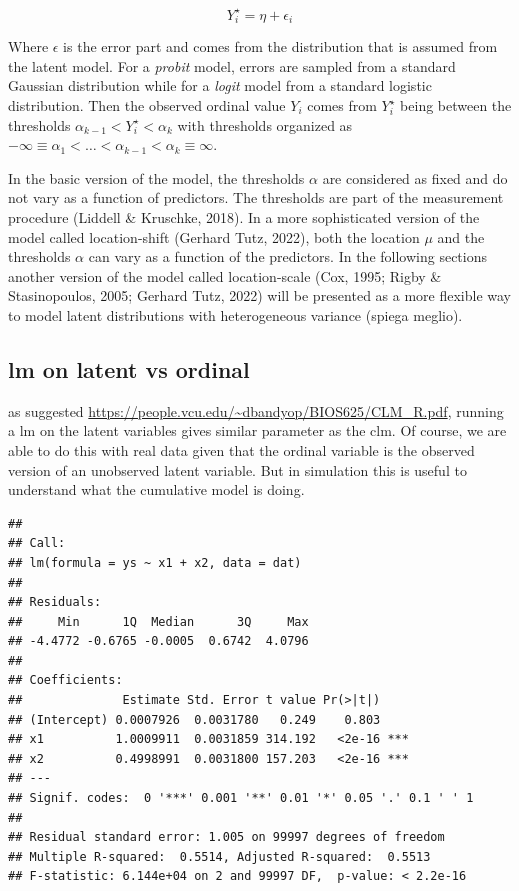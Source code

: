 \documentclass[
  man,floatsintext]{apa6}
\begin{document}
\begin{equation} 
Y^\star_i = \eta + \epsilon_i
\label{eq:latent-model}
\end{equation}

Where \(\epsilon\) is the error part and comes from the distribution that is assumed from the latent model. For a \emph{probit} model, errors are sampled from a standard Gaussian distribution while for a \emph{logit} model from a standard logistic distribution. Then the observed ordinal value \(Y_i\) comes from \(Y^\star_i\) being between the thresholds \(\alpha_{k - 1} < Y^\star_i < \alpha_{k}\) with thresholds organized as \(- \infty \equiv \alpha_1 < \dots< \alpha_{k - 1} < \alpha_k \equiv \infty\).

In the basic version of the model, the thresholds \(\alpha\) are considered as fixed and do not vary as a function of predictors. The thresholds are part of the measurement procedure (Liddell \& Kruschke, 2018). In a more sophisticated version of the model called location-shift (Gerhard Tutz, 2022), both the location \(\mu\) and the thresholds \(\alpha\) can vary as a function of the predictors. In the following sections another version of the model called location-scale (Cox, 1995; Rigby \& Stasinopoulos, 2005; Gerhard Tutz, 2022) will be presented as a more flexible way to model latent distributions with heterogeneous variance (spiega meglio).

\subsection{lm on latent vs ordinal}\label{lm-on-latent-vs-ordinal}

as suggested \url{https://people.vcu.edu/~dbandyop/BIOS625/CLM_R.pdf}, running a lm on the latent variables gives similar parameter as the clm. Of course, we are able to do this with real data given that the ordinal variable is the observed version of an unobserved latent variable. But in simulation this is useful to understand what the cumulative model is doing.

\scriptsize

\begin{verbatim}
## 
## Call:
## lm(formula = ys ~ x1 + x2, data = dat)
## 
## Residuals:
##     Min      1Q  Median      3Q     Max 
## -4.4772 -0.6765 -0.0005  0.6742  4.0796 
## 
## Coefficients:
##              Estimate Std. Error t value Pr(>|t|)    
## (Intercept) 0.0007926  0.0031780   0.249    0.803    
## x1          1.0009911  0.0031859 314.192   <2e-16 ***
## x2          0.4998991  0.0031800 157.203   <2e-16 ***
## ---
## Signif. codes:  0 '***' 0.001 '**' 0.01 '*' 0.05 '.' 0.1 ' ' 1
## 
## Residual standard error: 1.005 on 99997 degrees of freedom
## Multiple R-squared:  0.5514, Adjusted R-squared:  0.5513 
## F-statistic: 6.144e+04 on 2 and 99997 DF,  p-value: < 2.2e-16
\end{verbatim}
\end{document}
